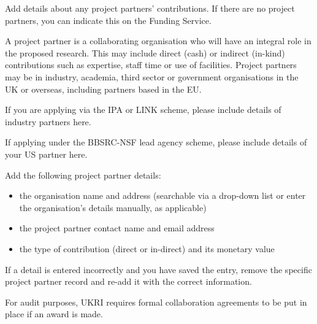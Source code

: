 
\begin{instruction}

Add details about any project partners’ contributions. If there are no project
partners, you can indicate this on the Funding Service.

A project partner is a collaborating organisation who will have an integral
role in the proposed research. This may include direct (cash) or indirect
(in-kind) contributions such as expertise, staff time or use of facilities.
Project partners may be in industry, academia, third sector or government
organisations in the UK or overseas, including partners based in the EU.

If you are applying via the IPA or LINK scheme, please include details of
industry partners here.

If applying under the BBSRC-NSF lead agency scheme, please include details
of your US partner here.

Add the following project partner details:

\begin{itemize}

    \item the organisation name and address (searchable via a drop-down list or enter
the organisation’s details manually, as applicable)

    \item the project partner contact name and email address

    \item the type of contribution (direct or in-direct) and its monetary value
\end{itemize}

If a detail is entered incorrectly and you have saved the entry, remove the
specific project partner record and re-add it with the correct information.

For audit purposes, UKRI requires formal collaboration agreements to be put in
place if an award is made.

\end{instruction}
